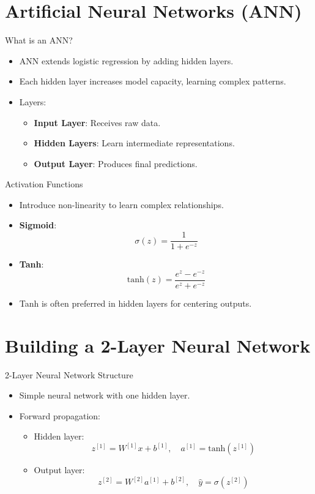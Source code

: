 \documentclass{beamer}
\begin{document}
\section{Artificial Neural Networks (ANN)}
\begin{frame}{What is an ANN?}
    \begin{itemize}
        \item ANN extends logistic regression by adding hidden layers.
        \item Each hidden layer increases model capacity, learning complex patterns.
        \item Layers:
            \begin{itemize}
                \item \textbf{Input Layer}: Receives raw data.
                \item \textbf{Hidden Layers}: Learn intermediate representations.
                \item \textbf{Output Layer}: Produces final predictions.
            \end{itemize}
    \end{itemize}
\end{frame}

\begin{frame}{Activation Functions}
    \begin{itemize}
        \item Introduce non-linearity to learn complex relationships.
        \item \textbf{Sigmoid}:
            $$
            \sigma(z) = \frac{1}{1 + e^{-z}}
            $$
        \item \textbf{Tanh}:
            $$
            \text{tanh}(z) = \frac{e^z - e^{-z}}{e^z + e^{-z}}
            $$
        \item Tanh is often preferred in hidden layers for centering outputs.
    \end{itemize}
\end{frame}

\section{Building a 2-Layer Neural Network}
\begin{frame}{2-Layer Neural Network Structure}
    \begin{itemize}
        \item Simple neural network with one hidden layer.
        \item Forward propagation:
            \begin{itemize}
                \item Hidden layer:
                $$
                z^{[1]} = W^{[1]} x + b^{[1]}, \quad a^{[1]} = \text{tanh}(z^{[1]})
                $$
                \item Output layer:
                $$
                z^{[2]} = W^{[2]} a^{[1]} + b^{[2]}, \quad \hat{y} = \sigma(z^{[2]})
                $$
            \end{itemize}
    \end{itemize}
\end{frame}
\end{document}
